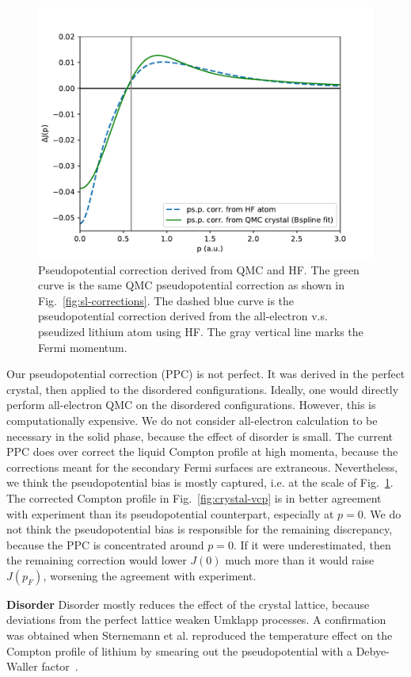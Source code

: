 \begin{figure}[h]
\centering
\includegraphics[width=0.8\linewidth]{li42c_bfd-dmcppc}
\caption{Pseudopotential correction derived from QMC and HF. The green curve is the same QMC pseudopotential correction as shown in Fig.~\ref{fig:sl-corrections}. The dashed blue curve is the pseudopotential correction derived from the all-electron v.s. pseudized lithium atom using HF. The gray vertical line marks the Fermi momentum. \label{fig:hf-ppc}}
\end{figure}

Our pseudopotential correction (PPC) is not perfect. It was derived in the perfect crystal, then applied to the disordered configurations. Ideally, one would directly perform all-electron QMC on the disordered configurations. However, this is computationally expensive. We do not consider all-electron calculation to be necessary in the solid phase, because the effect of disorder is small. The current PPC does over correct the liquid Compton profile at high momenta, because the corrections meant for the secondary Fermi surfaces are extraneous. Nevertheless, we think the pseudopotential bias is mostly captured, i.e. at the scale of Fig.~\ref{fig:hf-ppc}. The corrected Compton profile in Fig.~\ref{fig:crystal-vcp} is in better agreement with experiment than its pseudopotential counterpart, especially at $p=0$. We do not think the pseudopotential bias is responsible for the remaining discrepancy, because the PPC is concentrated around $p=0$. If it were underestimated, then the remaining correction would lower $J(0)$ much more than it would raise $J(p_F)$, worsening the agreement with experiment. 

{\bf Disorder}  Disorder mostly reduces the effect of the crystal lattice, because deviations from the perfect lattice weaken Umklapp processes. A confirmation was obtained when Sternemann et al. reproduced the temperature effect on the Compton profile of lithium by smearing out the pseudopotential with a Debye-Waller factor~\cite{Sternemann2001}.

